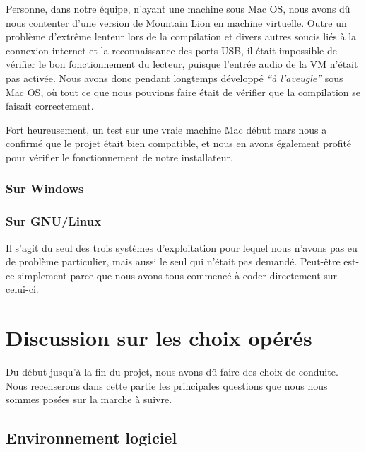 \documentclass[a4paper,11pt]{article}
\begin{document}
Personne, dans notre équipe, n'ayant une machine sous Mac OS, nous avons dû nous contenter d'une version de Mountain Lion en machine virtuelle. Outre un problème d'extrême lenteur lors de la compilation et divers autres soucis liés à la connexion internet et la reconnaissance des ports USB, il était impossible de vérifier le bon fonctionnement du lecteur, puisque l'entrée audio de la VM n'était pas activée. Nous avons donc pendant longtemps développé \textit{``à l'aveugle''} sous Mac OS, où tout ce que nous pouvions faire était de vérifier que la compilation se faisait correctement.

Fort heureusement, un test sur une vraie machine Mac début mars nous a confirmé que le projet était bien compatible, et nous en avons également profité pour vérifier le fonctionnement de notre installateur.

\subsubsection*{Sur Windows}


\subsubsection*{Sur GNU/Linux}

Il s'agit du seul des trois systèmes d'exploitation pour lequel nous n'avons pas eu de problème particulier, mais aussi le seul qui n'était pas demandé. Peut-être est-ce simplement parce que nous avons tous commencé à coder directement sur celui-ci.

\clearpage

\section{Discussion sur les choix opérés}

Du début jusqu'à la fin du projet, nous avons dû faire des choix de conduite. Nous recenserons dans cette partie les principales questions que nous nous sommes posées sur la marche à suivre.

\subsection{Environnement logiciel}
\end{document}
